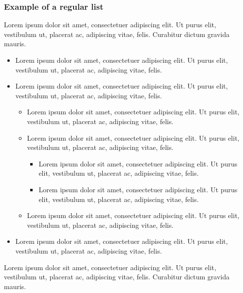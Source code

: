 \documentclass[draft*,nochapters]{aaltoseries}
\begin{document}
\subsubsection{Example of a regular list}
Lorem ipsum dolor sit amet, consectetuer adipiscing elit. Ut purus elit,  vestibulum ut, placerat ac, adipiscing vitae, felis. Curabitur dictum gravida mauris.
\begin{itemize}
\item Lorem ipsum dolor sit amet, consectetuer adipiscing elit. Ut purus elit,  vestibulum ut, placerat ac, adipiscing vitae, felis.
\item Lorem ipsum dolor sit amet, consectetuer adipiscing elit. Ut purus elit,  vestibulum ut, placerat ac, adipiscing vitae, felis.
\begin{itemize}
\item Lorem ipsum dolor sit amet, consectetuer adipiscing elit. Ut purus elit,  vestibulum ut, placerat ac, adipiscing vitae, felis.
\item Lorem ipsum dolor sit amet, consectetuer adipiscing elit. Ut purus elit,  vestibulum ut, placerat ac, adipiscing vitae, felis.
\begin{itemize}
\item Lorem ipsum dolor sit amet, consectetuer adipiscing elit. Ut purus elit,  vestibulum ut, placerat ac, adipiscing vitae, felis.
\item Lorem ipsum dolor sit amet, consectetuer adipiscing elit. Ut purus elit,  vestibulum ut, placerat ac, adipiscing vitae, felis.
\end{itemize}
\item Lorem ipsum dolor sit amet, consectetuer adipiscing elit. Ut purus elit,  vestibulum ut, placerat ac, adipiscing vitae, felis.
\end{itemize}
\item Lorem ipsum dolor sit amet, consectetuer adipiscing elit. Ut purus elit,  vestibulum ut, placerat ac, adipiscing vitae, felis.
\end{itemize}
Lorem ipsum dolor sit amet, consectetuer adipiscing elit. Ut purus elit,  vestibulum ut, placerat ac, adipiscing vitae, felis. Curabitur dictum gravida mauris.
\end{document}
